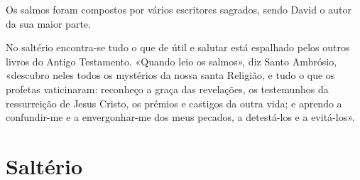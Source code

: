 Os salmos foram compostos por vários escritores sagrados, sendo David o autor da sua maior parte.

No saltério encontra-se tudo o que de útil e salutar está espalhado pelos outros livros do Antigo Testamento. «Quando leio os salmos», diz Santo Ambrósio, «descubro neles todos os mystérios da nossa santa Religião, e tudo o que os profetas vaticinaram: reconheço a graça das revelações, os testemunhos da ressurreição de Jesus Cristo, os prémios e castigos da outra vida; e aprendo a confundir-me e a envergonhar-me dos meus pecados, a detestá-los e a evitá-los».

\newpage\null\thispagestyle{empty}\newpage

\section{Saltério}

\label{salmo1}


\label{salmo2}


\label{salmo3}


\label{salmo4}


\label{salmo5}


\label{salmo6}


\label{salmo7}


\label{salmo8}


\label{salmo9}


\label{salmo10}


\label{salmo11}


\label{salmo12}


